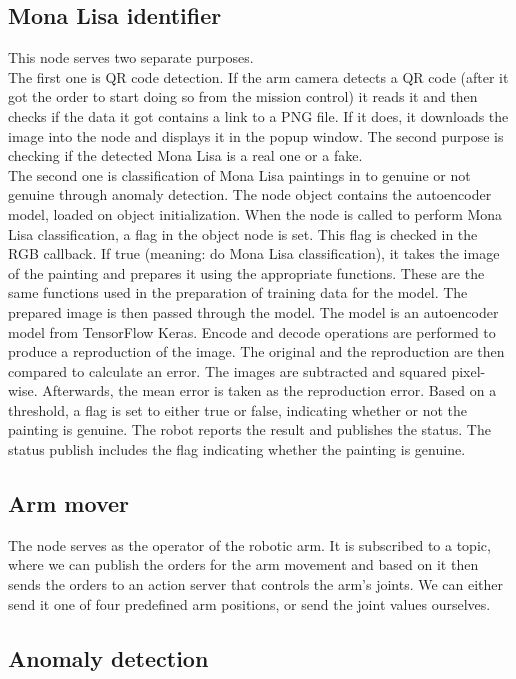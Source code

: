 \documentclass[a4paper,
  twoside, %
  headlines=2.1 %
  ]{scrartcl}
\begin{document}
\subsection{Mona Lisa identifier}
This node serves two separate purposes.\\
The first one is QR code detection. If the arm camera detects a QR code (after it got the order to start doing so from the mission control) it reads it and then checks if the data it got contains a link to a PNG file. If it does, it downloads the image into the node and displays it in the popup window.
The second purpose is checking if the detected Mona Lisa is a real one or a fake. 
\\
The second one is classification of Mona Lisa paintings in to genuine or not genuine through anomaly detection. The node object contains the autoencoder model, loaded on object initialization. When the node is called to perform Mona Lisa classification, a flag in the object node is set. This flag is checked in the RGB callback. If true (meaning: do Mona Lisa classification), it takes the image of the painting and prepares it using the appropriate functions. These are the same functions used in the preparation of training data for the model. The prepared image is then passed through the model. The model is an autoencoder model from TensorFlow Keras. Encode and decode operations are performed to produce a reproduction of the image. The original and the reproduction are then compared to calculate an error. The images are subtracted and squared pixel-wise. Afterwards, the mean error is taken as the reproduction error. Based on a threshold, a flag is set to either true or false, indicating whether or not the painting is genuine. The robot reports the result and publishes the status. The status publish includes the flag indicating whether the painting is genuine. 

\subsection{Arm mover}
The node serves as the operator of the robotic arm. It is subscribed to a topic, where we can publish the orders for the arm movement and based on it then sends the orders to an action server that controls the arm's joints. We can either send it one of four predefined arm positions, or send the joint values ourselves.

\subsection{Anomaly detection}
\end{document}
